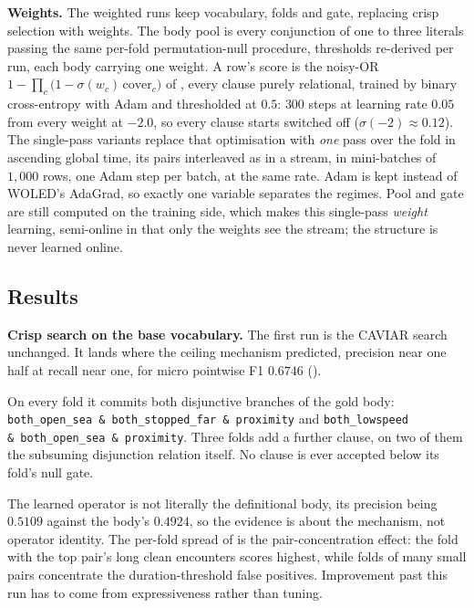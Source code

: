 \textbf{Weights.} The weighted runs keep vocabulary, folds and gate, replacing crisp selection with weights. The body pool is every conjunction of one to three literals passing the same per-fold permutation-null procedure, thresholds re-derived per run, each body carrying one weight. A row's score is the noisy-OR $1-\prod_c\bigl(1-\sigma(w_c)\,\mathrm{cover}_c\bigr)$ of , every clause purely relational, trained by binary cross-entropy with Adam and thresholded at $0.5$: $300$ steps at learning rate $0.05$ from every weight at $-2.0$, so every clause starts switched off ($\sigma(-2)\approx0.12$). The single-pass variants replace that optimisation with \emph{one} pass over the fold in ascending global time, its pairs interleaved as in a stream, in mini-batches of $1{,}000$ rows, one Adam step per batch, at the same rate. Adam is kept instead of WOLED's AdaGrad, so exactly one variable separates the regimes. Pool and gate are still computed on the training side, which makes this single-pass \emph{weight} learning, semi-online in that only the weights see the stream; the structure is never learned online.

\subsection{Results}

\textbf{Crisp search on the base vocabulary.} The first run is the CAVIAR search unchanged. It lands where the ceiling mechanism predicted, precision near one half at recall near one, for micro pointwise F1 $\mathbf{0.6746}$ ().

On every fold it commits both disjunctive branches of the gold body: \texttt{both\_open\_sea \&\allowbreak\ both\_stopped\_far \&\allowbreak\ proximity} and \texttt{both\_lowspeed \&\allowbreak\ both\_open\_sea \&\allowbreak\ proximity}. Three folds add a further clause, on two of them the subsuming disjunction relation itself. No clause is ever accepted below its fold's null gate.

The learned operator is not literally the definitional body, its precision being $0.5109$ against the body's $0.4924$, so the evidence is about the mechanism, not operator identity. The per-fold spread of  is the pair-concentration effect: the fold with the top pair's long clean encounters scores highest, while folds of many small pairs concentrate the duration-threshold false positives. Improvement past this run has to come from expressiveness rather than tuning.

